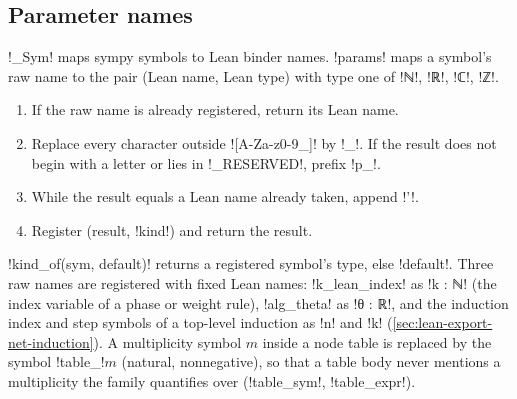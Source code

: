 {\subsection{Parameter names}\label{sec:lean-export-net-sym}

\py!_Sym! maps sympy symbols to Lean binder names. \py!params! maps a symbol's raw name to the
pair (Lean name, Lean type) with type one of \code!ℕ!, \leanx!ℝ!, \code!ℂ!, \leanx!ℤ!.

\begin{algorithm}\label{alg:lean-export-net-name}
\begin{enumerate}
\item If the raw name is already registered, return its Lean name.
\item Replace every character outside \code![A-Za-z0-9_]! by \code!_!. If the result does not
  begin with a letter or lies in \py!_RESERVED!, prefix \code!p_!.
\item While the result equals a Lean name already taken, append \code!'!.
\item Register (result, \py!kind!) and return the result.
\end{enumerate}
\end{algorithm}

\py!kind_of(sym, default)! returns a registered symbol's type, else \py!default!. Three raw names
are registered with fixed Lean names: \code!k_lean_index! as \code!k : ℕ! (the index variable of
a phase or weight rule), \code!alg_theta! as \leanx!θ : ℝ!, and the induction index and step
symbols of a top-level induction as \code!n! and \code!k! (\cref{sec:lean-export-net-induction}).
A \bbox{} multiplicity symbol $m$ inside a node table is replaced by the symbol
\code!table_!$m$ (natural, nonnegative), so that a table body never mentions a multiplicity the
family quantifies over (\py!table_sym!, \py!table_expr!).

}
